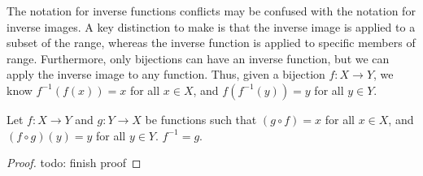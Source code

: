 The notation for inverse functions conflicts may be confused with the notation for inverse images. A key distinction to make is that the inverse image is applied to a subset of the range, whereas the inverse function is applied to specific members of range. Furthermore, only bijections can have an inverse function, but we can apply the inverse image to any function. Thus, given a bijection $f : X \to Y$, we know $f^{-1}(f(x)) = x$ for all $x \in X$, and $f(f^{-1}(y)) = y$ for all $y \in Y$.

\begin{exbox}{}{}
    Let $f : X \to Y$ and $g : Y \to X$ be functions such that $(g \circ f) = x$ for all $x \in X$, and $(f \circ g)(y) = y$ for all $y \in Y$. $f^{-1} = g$.
    \tcblower
    \begin{proof}
        todo: finish proof
    \end{proof}
\end{exbox}
